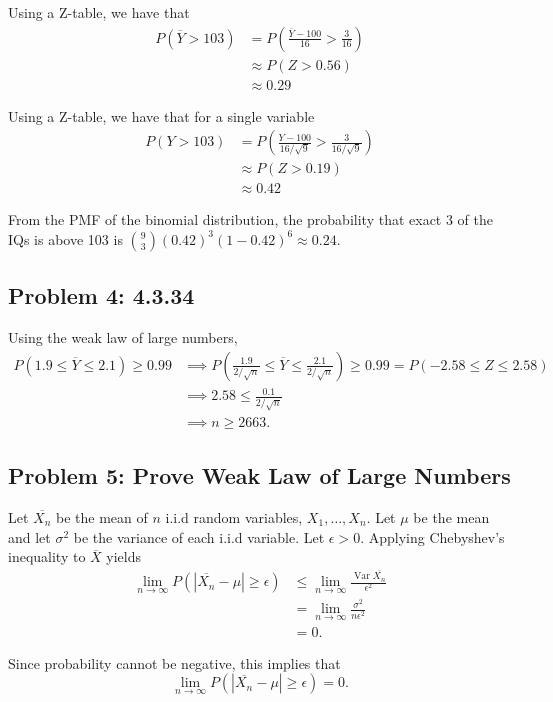 \documentclass{article}
\newcommand{\var}{\operatorname{Var}}
\begin{document}
Using a Z-table, we have that
\begin{align*}
	P(\overline{Y} > 103) 
	&= P(\frac{\overline{Y} - 100}{16} > \frac{3}{16}) \\
	&\approx P(Z > 0.56) \\
	&\approx 0.29
\end{align*}

Using a Z-table, we have that for a single variable
\begin{align*}
	P(Y > 103) 
	&= P(\frac{Y-100}{16/\sqrt{9}} > \frac{3}{16/\sqrt{9}}) \\
	&\approx P(Z > 0.19) \\
	&\approx 0.42
\end{align*}

From the PMF of the binomial distribution,
the probability that exact 3 of the IQs is above 103 is 
$\binom{9}{3}(0.42)^3(1-0.42)^6 \approx 0.24$.
\newpage 

\subsection*{Problem 4: 4.3.34}
Using the weak law of large numbers,
\begin{align*}
	P(1.9 \leq \overline{Y} \leq 2.1) \geq 0.99
	&\implies P(\frac{1.9}{2/\sqrt{n}} \leq \overline{Y} \leq \frac{2.1}{2/\sqrt{n}}) \geq 0.99  = P(-2.58 \leq Z \leq 2.58)\\
	&\implies  2.58 \leq \frac{0.1}{2/\sqrt{n}}\\
	&\implies n \geq 2663.
\end{align*}
\newpage 

\subsection*{Problem 5: Prove Weak Law of Large Numbers}
Let $\overline{X_n}$ be the mean of $n$ i.i.d random variables, $X_1,\hdots,X_n$.
Let $\mu$ be the mean and let $\sigma^2$ be the variance of each i.i.d variable.
Let $\epsilon > 0$.
Applying Chebyshev's inequality to $\overline{X}$ yields 
\begin{align*}
	\lim_{n \to \infty} P(|\overline{X_n} - \mu| \geq \epsilon) 
	&\leq \lim_{n \to \infty} \frac{\var{\overline{X_n}}}{\epsilon^2} \\
	&= \lim_{n \to \infty} \frac{\sigma^2}{n\epsilon^2} \\
	&= 0.
\end{align*}

Since probability cannot be negative, this implies that 
\[
	\lim_{n \to \infty} P(|\overline{X_n} - \mu| \geq \epsilon) = 0.
\]
\newpage 
\end{document}
